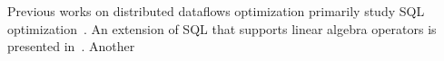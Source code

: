 Previous works on distributed dataflows optimization primarily study SQL optimization~\cite{chang2014hawq, armbrust2015spark, sethi2019presto}. An extension of SQL that supports linear algebra operators is presented in~\cite{schule2019mlearn}. Another 